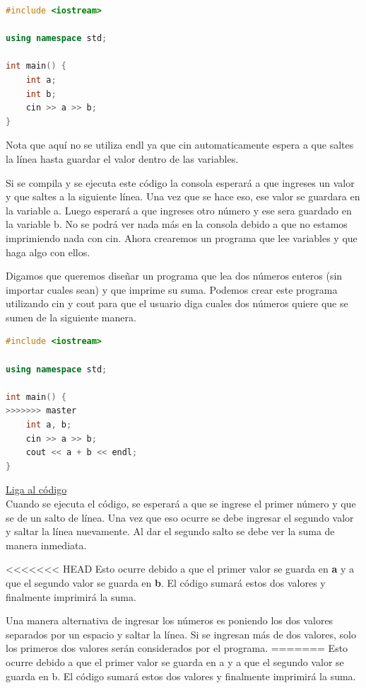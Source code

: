 \documentclass{article}
\begin{document}
\begin{lstlisting}[language=C++, title=Leyendo dos enteros]
#include <iostream>

using namespace std;

int main() {
	int a;
	int b;
	cin >> a >> b;
}
\end{lstlisting}

Nota que aquí no se utiliza endl ya que cin automaticamente espera a que saltes la línea hasta guardar el valor dentro de las variables.

Si se compila y se ejecuta este código la consola esperará a que ingreses un valor y que saltes a la siguiente línea. Una vez que se hace eso, ese valor se guardara en la variable a. Luego esperará a que ingreses otro número y ese sera guardado en la variable b. No se podrá ver nada más en la consola debido a que no estamos imprimiendo nada con cin. Ahora crearemos un programa que lee variables y que haga algo con ellos.

Digamos que queremos diseñar un programa que lea dos números enteros (sin importar cuales sean) y que imprime su suma. Podemos crear este programa utilizando cin y cout para que el usuario diga cuales dos números quiere que se sumen de la siguiente manera.

\begin{lstlisting}[language=C++, title=Suma]
#include <iostream>

using namespace std;

int main() {
>>>>>>> master
	int a, b;
	cin >> a >> b;
	cout << a + b << endl;
}
\end{lstlisting}
\href{https://repl.it/@Jamesscn/Suma}{Liga al código}\\

Cuando se ejecuta el código, se esperará a que se ingrese el primer número y que se de un salto de línea. Una vez que eso ocurre se debe ingresar el segundo valor y saltar la línea nuevamente. Al dar el segundo salto se debe ver la suma de manera inmediata.

<<<<<<< HEAD
Esto ocurre debido a que el primer valor se guarda en \textbf{a} y a que el segundo valor se guarda en \textbf{b}. El código sumará estos dos valores y finalmente imprimirá la suma.

Una manera alternativa de ingresar los números es poniendo los dos valores separados por un espacio y saltar la línea. Si se ingresan más de dos valores, solo los primeros dos valores serán considerados por el programa.
=======
Esto ocurre debido a que el primer valor se guarda en a y a que el segundo valor se guarda en b. El código sumará estos dos valores y finalmente imprimirá la suma.
\end{document}
